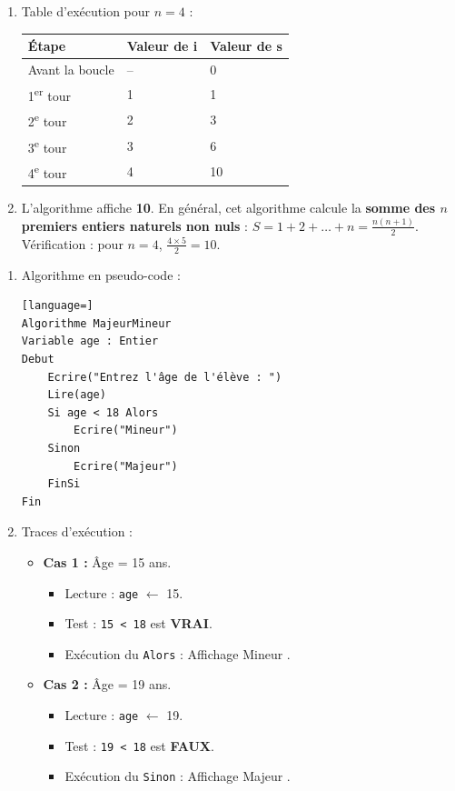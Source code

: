 \documentclass[11pt]{article}
\newcounter{popsec}
\newcounter{popsub}
\newcommand{\courssub}[1]{%
  \stepcounter{popsub}%
  \par\vspace{9pt}\noindent{\popxbold\fontsize{11.5}{13}\selectfont\color{popink}{\color{poporange}\thepopsec.\thepopsub}\hspace{6pt}#1}\par\nopagebreak\vspace{4pt}
}
\begin{document}
\begin{corrige}
\begin{enumerate}
\item Table d'exécution pour $n = 4$ :
\begin{center}
\begin{tabularx}{\linewidth}{|l|X|X|}
\hline
\rowcolor{popblueL} \textbf{Étape} & \textbf{Valeur de i} & \textbf{Valeur de s} \\
\hline
Avant la boucle & -- & 0 \\
\hline
1\textsuperscript{er} tour & 1 & 1 \\
\hline
2\textsuperscript{e} tour & 2 & 3 \\
\hline
3\textsuperscript{e} tour & 3 & 6 \\
\hline
4\textsuperscript{e} tour & 4 & 10 \\
\hline
\end{tabularx}
\end{center}
\item L'algorithme affiche \textbf{10}.
En général, cet algorithme calcule la \textbf{somme des $n$ premiers entiers naturels non nuls} : $S = 1 + 2 + \dots + n = \frac{n(n+1)}{2}$.
Vérification : pour $n=4$, $\frac{4 \times 5}{2} = 10$.
\end{enumerate}
\end{corrige}

\courssub{Je m'entraîne}

\begin{corrige}
\begin{enumerate}
\item Algorithme en pseudo-code :
\begin{lstlisting}[language=]
Algorithme MajeurMineur
Variable age : Entier
Debut
    Ecrire("Entrez l'âge de l'élève : ")
    Lire(age)
    Si age < 18 Alors
        Ecrire("Mineur")
    Sinon
        Ecrire("Majeur")
    FinSi
Fin
\end{lstlisting}
\item Traces d'exécution :
\begin{itemize}
\item \textbf{Cas 1 :} Âge = 15 ans.
\begin{itemize}
\item Lecture : \texttt{age} $\leftarrow$ 15.
\item Test : \texttt{15 < 18} est \textbf{VRAI}.
\item Exécution du \texttt{Alors} : Affichage \og Mineur \fg{}.
\end{itemize}
\item \textbf{Cas 2 :} Âge = 19 ans.
\begin{itemize}
\item Lecture : \texttt{age} $\leftarrow$ 19.
\item Test : \texttt{19 < 18} est \textbf{FAUX}.
\item Exécution du \texttt{Sinon} : Affichage \og Majeur \fg{}.
\end{itemize}
\end{itemize}
\end{enumerate}
\end{corrige}
\end{document}

